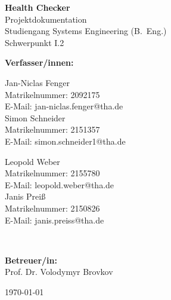 \documentclass[a4paper,12pt,ngerman]{article}
\begin{document}
	
	\begin{titlepage}
		\centering
		\vspace*{1cm}
		
		{\LARGE \textbf{Health Checker}}\\[1cm]
		
		{\large Projektdokumentation}\\[1.0cm]
		{\large Studiengang Systems Engineering (B.~Eng.)}\\[0.3cm]
		{\large Schwerpunkt I.2}\\[1.5cm]
		
		\vfill
    
		\textbf{Verfasser/innen:}\\[1cm]
    	\begin{center}
		\begin{minipage}[t]{0.45\textwidth}
        \raggedright
        Jan-Niclas Fenger \\
        Matrikelnummer: 2092175 \\
        E-Mail: jan-niclas.fenger@tha.de \\[0.5cm]
		
        Simon Schneider \\
        Matrikelnummer: 2151357 \\
        E-Mail: simon.schneider1@tha.de
		\end{minipage}
		\hfill
		\begin{minipage}[t]{0.45\textwidth}
        \raggedright
        Leopold Weber \\
        Matrikelnummer: 2155780 \\
        E-Mail: leopold.weber@tha.de \\[0.5cm]
    
        Janis Preiß \\
        Matrikelnummer: 2150826 \\
        E-Mail: janis.preiss@tha.de
		\end{minipage}
		\\[1.5cm]
		\end{center}
		
		\textbf{Betreuer/in:}\\[0.5cm]
		Prof. Dr. Volodymyr Brovkov\\[3cm]
		
		\vfill
		
		{\large \today}
		
		\thispagestyle{empty} %
	\end{titlepage}
	
	\newpage
	\setcounter{page}{2}   %
	\tableofcontents
	\thispagestyle{plain}  %
	
	\newpage

	
	\listoftodos{}
\end{document}
